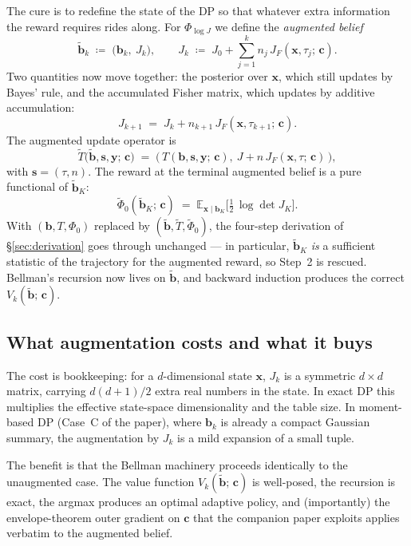 \documentclass[11pt]{article}
\newcommand{\bc}{\bm{c}}
\newcommand{\bx}{\bm{x}}
\newcommand{\by}{\bm{y}}
\newcommand{\bs}{\bm{s}}
\newcommand{\bb}{\bm{b}}
\newcommand{\E}{\mathbb{E}}
\begin{document}
The cure is to redefine the state of the DP so that whatever extra information the reward requires rides along.  For $\Phi_{\log J}$ we define the \emph{augmented belief}
\begin{equation}
\tilde{\bb}_k \;\coloneqq\; \bigl(\bb_k,\ J_k\bigr), \qquad J_k \;\coloneqq\; J_0 + \sum_{j=1}^k n_j\, J_F(\bx, \tau_j;\, \bc).
\label{eq:augmented_belief}
\end{equation}
Two quantities now move together: the posterior over $\bx$, which still updates by Bayes' rule, and the accumulated Fisher matrix, which updates by additive accumulation:
\begin{equation}
J_{k+1} \;=\; J_k + n_{k+1}\, J_F(\bx, \tau_{k+1};\, \bc).
\end{equation}
The augmented update operator is
\begin{equation}
\tilde{T}\bigl(\tilde{\bb}, \bs, \by;\, \bc\bigr) \;=\; \bigl(\, T(\bb, \bs, \by;\, \bc),\ J + n\, J_F(\bx, \tau;\, \bc) \,\bigr),
\end{equation}
with $\bs = (\tau, n)$.  The reward at the terminal augmented belief is a pure functional of $\tilde{\bb}_K$:
\begin{equation}
\tilde{\Phi}_0(\tilde{\bb}_K;\, \bc) \;=\; \E_{\bx \mid \bb_K}\!\bigl[\tfrac{1}{2}\, \log \det J_K\bigr].
\end{equation}
With $(\bb, T, \Phi_0)$ replaced by $(\tilde{\bb}, \tilde{T}, \tilde{\Phi}_0)$, the four-step derivation of §\ref{sec:derivation} goes through unchanged --- in particular, $\tilde{\bb}_K$ \emph{is} a sufficient statistic of the trajectory for the augmented reward, so Step~2 is rescued.  Bellman's recursion now lives on $\tilde{\bb}$, and backward induction produces the correct $V_k(\tilde{\bb};\, \bc)$.

\subsection{What augmentation costs and what it buys}

The cost is bookkeeping: for a $d$-dimensional state $\bx$, $J_k$ is a symmetric $d \times d$ matrix, carrying $d(d+1)/2$ extra real numbers in the state.  In exact DP this multiplies the effective state-space dimensionality and the table size.  In moment-based DP (Case~C of the paper), where $\bb_k$ is already a compact Gaussian summary, the augmentation by $J_k$ is a mild expansion of a small tuple.

The benefit is that the Bellman machinery proceeds identically to the unaugmented case.  The value function $V_k(\tilde{\bb};\, \bc)$ is well-posed, the recursion is exact, the argmax produces an optimal adaptive policy, and (importantly) the envelope-theorem outer gradient on $\bc$ that the companion paper exploits applies verbatim to the augmented belief.
\end{document}
